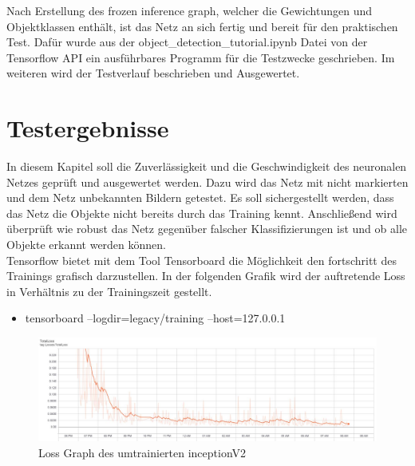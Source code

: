 \documentclass[a4paper,12pt,oneside]{article}
\begin{document}
Nach Erstellung des \glqq frozen inference graph\grqq , welcher die Gewichtungen und Objektklassen enthält, ist das Netz an sich fertig und bereit für den praktischen Test. Dafür wurde aus der object\_detection\_tutorial.ipynb Datei von der Tensorflow API ein ausführbares Programm für die Testzwecke geschrieben. Im weiteren wird der Testverlauf beschrieben und Ausgewertet.
  
\newpage

\section{Testergebnisse}
In diesem Kapitel soll die Zuverlässigkeit und die Geschwindigkeit des neuronalen Netzes geprüft und ausgewertet werden. Dazu wird das Netz mit nicht markierten und dem Netz unbekannten Bildern getestet. Es soll sichergestellt werden, dass das Netz die Objekte nicht bereits durch das Training kennt. Anschließend wird überprüft wie robust das Netz gegenüber falscher Klassifizierungen ist und ob alle Objekte erkannt werden können. 
\\
Tensorflow bietet mit dem Tool Tensorboard die Möglichkeit den fortschritt des Trainings grafisch darzustellen. In der folgenden Grafik wird der auftretende \glqq Loss \glqq in Verhältnis zu der Trainingszeit gestellt. 
\\
 \begin{itemize}
\item tensorboard --logdir=legacy/training --host=127.0.0.1
  \end{itemize}
  
\begin{figure}
    [h]
	\centering
	\includegraphics[scale=0.4]{Sources/loss_graph_200000.jpg}
	\caption{Loss Graph des umtrainierten inceptionV2}
	\label{img:loss_graph_200000}
\end{figure}
\end{document}
